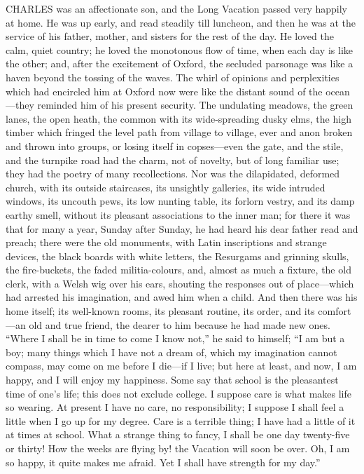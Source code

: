 CHARLES was an affectionate son, and the
Long Vacation passed very happily at home. He was up early, and read
steadily till luncheon, and then he was at the service of his father,
mother, and sisters for the rest of the day. He loved the calm, quiet
country; he loved the monotonous flow of time, when each day is like
the other; and, after the excitement of Oxford, the secluded parsonage
was like a haven beyond the tossing of the waves. The whirl of
opinions and perplexities which had encircled him at Oxford now were
like the distant sound of the ocean—they reminded him of his present
security. The undulating meadows, the green lanes, the open heath, the
common with its wide-spreading dusky elms, the high timber which
fringed the level path from village to village, ever and anon broken
and thrown into groups, or losing itself in copses—even the gate,
and the stile, and the turnpike road had the charm, not of novelty,
but of long familiar use; they had the poetry of many recollections.
Nor was the dilapidated, deformed church, with its outside staircases,
its unsightly galleries, its wide intruded windows, its uncouth pews,
its low nunting table, its forlorn vestry, and its damp earthy smell, without its pleasant associations to the inner man; for there
it was that for many a year, Sunday after Sunday, he had heard his
dear father read and preach; there were the old monuments, with Latin
inscriptions and strange devices, the black boards with white letters,
the Resurgams and grinning skulls, the fire-buckets, the faded
militia-colours, and, almost as much a fixture, the old clerk, with a
Welsh wig over his ears, shouting the responses out of place—which
had arrested his imagination, and awed him when a child. And then
there was his home itself; its well-known rooms, its pleasant routine,
its order, and its comfort—an old and true friend, the dearer to him
because he had made new ones. ``Where I shall be in time to come I
know not,'' he said to himself; ``I am but a boy; many things
which I have not a dream of, which my imagination cannot compass, may
come on me before I die—if I live; but here at least, and now, I am
happy, and I will enjoy my happiness. Some say that school is the
pleasantest time of one's life; this does not exclude college. I
suppose care is what makes life so wearing. At present I have no care,
no responsibility; I suppose I shall feel a little when I go up for my
degree. Care is a terrible thing; I have had a little of it at times
at school. What a strange thing to fancy, I shall be one day
twenty-five or thirty! How the weeks are flying by! the Vacation will
soon be over. Oh, I am so happy, it quite makes me afraid. Yet I shall
have strength for my day.''

